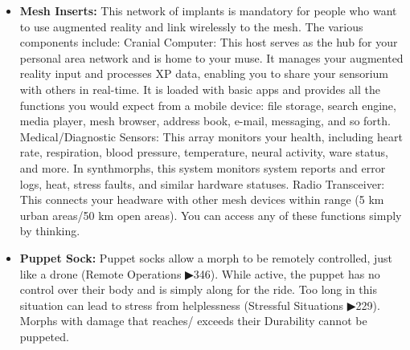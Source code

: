 \begin{itemize}
    \item \textbf{Mesh Inserts:} This network of implants is mandatory for people who want to use augmented reality and link wirelessly to the mesh. The various components include: Cranial Computer: This host serves as the hub for your personal area network and is home to your muse. It manages your augmented reality input and processes XP data, enabling you to share your sensorium with others in real-time. It is loaded with basic apps and provides all the functions you would expect from a mobile device: file storage, search engine, media player, mesh browser, address book, e-mail, messaging, and so forth. Medical/Diagnostic Sensors: This array monitors your health, including heart rate, respiration, blood pressure, temperature, neural activity, ware status, and more. In synthmorphs, this system monitors system reports and error logs, heat, stress faults, and similar hardware statuses. Radio Transceiver: This connects your headware with other mesh devices within range (5 km urban areas/50 km open areas). You can access any of these functions simply by thinking. \citep[pg. 316]{ep2e_1.1_2019}

    \item \textbf{Puppet Sock:} Puppet socks allow a morph to be remotely controlled, just like a drone (Remote Operations ▶346). While active, the puppet has no control over their body and is simply along for the ride. Too long in this situation can lead to stress from helplessness (Stressful Situations ▶229). Morphs with damage that reaches/ exceeds their Durability cannot be puppeted. \citep[pg. 316]{ep2e_1.1_2019}
\end{itemize}